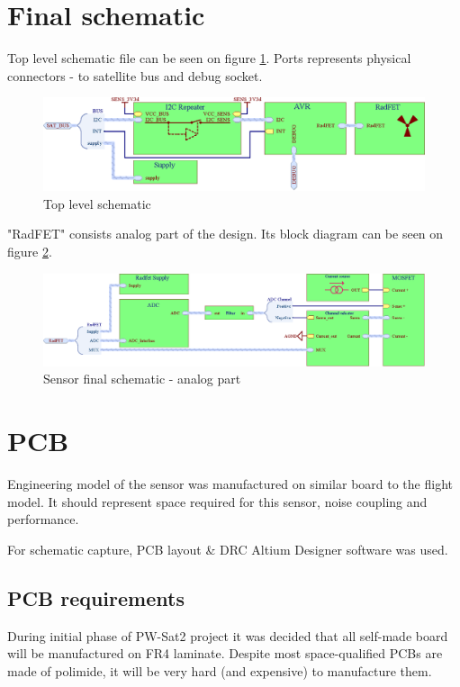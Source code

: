 \section{Final schematic}
    Top level schematic file can be seen on figure \ref{top_level_schematic}. Ports represents physical connectors - to satellite bus and debug socket.

    \begin{figure}[H]
        \centering
        \includegraphics[width=0.8\paperwidth]{img/06/final_schematic_top.eps}
        \caption{Top level schematic}
        \label{top_level_schematic}
    \end{figure}

    "RadFET" consists analog part of the design. Its block diagram can be seen on figure \ref{analog_schematic}.

    \begin{figure}[H]
        \centering
        \includegraphics[width=0.8\paperwidth]{img/06/final_schematic_radfet.eps}
        \caption{Sensor final schematic - analog part}
        \label{analog_schematic}
    \end{figure}


\section{PCB}
    Engineering model of the sensor was manufactured on similar board to the flight model. It should represent space required for this sensor, noise coupling and performance.

    For schematic capture, PCB layout \& DRC Altium Designer software was used.

    \subsection{PCB requirements}
        During initial phase of PW-Sat2 project it was decided that all self-made board will be manufactured on FR4 laminate. Despite most space-qualified PCBs are made of polimide, it will be very hard (and expensive) to manufacture them.

